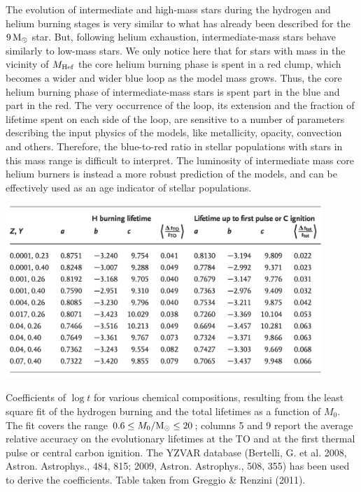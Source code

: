 \documentclass[a4paper,10pt]{article}
\begin{document}
{\noindent}The evolution of intermediate and high-mass stars during the hydrogen and helium burning stages is very similar to what has already been described for the $9\,{\rm M_\odot}$ star. But, following helium exhaustion, intermediate-mass stars behave similarly to low-mass stars. We only notice here that for stars with mass in the vicinity of $M_{\rm Hef}$ the core helium burning phase is spent in a red clump, which becomes a wider and wider blue loop as the model mass grows. Thus, the core helium burning phase of intermediate-mass stars is spent part in the blue and part in the red. The very occurrence of the loop, its extension and the fraction of lifetime spent on each side of the loop, are sensitive to a number of parameters describing the input physics of the models, like metallicity, opacity, convection and others. Therefore, the blue-to-red ratio in stellar populations with stars in this mass range is difficult to interpret. The luminosity of intermediate mass core helium burners is instead a more robust prediction of the models, and can be effectively used as an age indicator of stellar populations.

\begin{table}[t]
    \centering
    \includegraphics[width=12cm]{figures/HRD_Z_coeff.png}
    \caption{\footnotesize{Coefficients of $\log t$ for various chemical compositions, resulting from the least square fit of the hydrogen burning and the total lifetimes as a function of $M_0$. The fit covers the range $0.6\leq M_0/{\rm M_\odot} \leq20$; columns 5 and 9 report the average relative accuracy on the evolutionary lifetimes at the TO and at the first thermal pulse or central carbon ignition. The YZVAR database (Bertelli, G. et al. 2008, Astron. Astrophys., 484, 815; 2009, Astron. Astrophys., 508, 355) has been used to derive the coefficients. Table taken from Greggio \& Renzini (2011).}}
    \label{table:hrdz_coeff}
\end{table}
\end{document}
